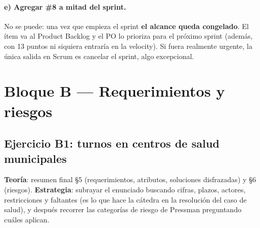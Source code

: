 \documentclass[11pt,a4paper]{article}
\begin{document}
\paragraph{e) Agregar \#8 a mitad del sprint.} No se puede: una vez que empieza el sprint \textbf{el alcance
queda congelado}. El ítem va al Product Backlog y el PO lo prioriza para el próximo sprint (además, con 13
puntos ni siquiera entraría en la velocity). Si fuera realmente urgente, la única salida en Scrum es cancelar el
sprint, algo excepcional.

\section{Bloque B --- Requerimientos y riesgos}
\subsection*{Ejercicio B1: turnos en centros de salud municipales}
\textbf{Teoría}: resumen final §5 (requerimientos, atributos, soluciones disfrazadas) y §6 (riesgos).
\textbf{Estrategia}: subrayar el enunciado buscando cifras, plazos, actores, restricciones y faltantes (es lo que
hace la cátedra en la resolución del caso de salud), y después recorrer las categorías de riesgo de Pressman
preguntando cuáles aplican.
\end{document}
